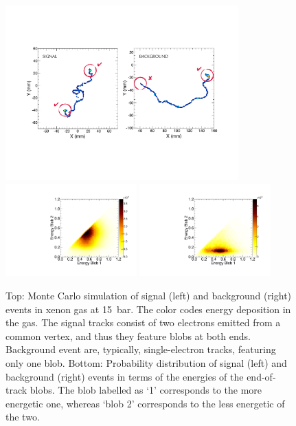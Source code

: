 \documentclass{PoS}
\begin{document}
\begin{figure}
\centering
\includegraphics[width= 0.8\textwidth]{img/TrackSignature.pdf}
\includegraphics[width=0.45\textwidth]{img/EnergyBlobsSignal.pdf}
\includegraphics[width=0.45\textwidth]{img/EnergyBlobsTl208.pdf}
\caption{Top: Monte Carlo simulation of signal (left) and background (right) events in xenon gas at 15~bar. The color codes energy deposition in the gas. The signal tracks consist of two electrons emitted from a common vertex, and thus they feature blobs at both ends. Background event are, typically, single-electron tracks, featuring only one blob. Bottom: Probability distribution of signal (left) and background (right) events in terms of the energies of the end-of-track blobs. The blob labelled as `1' corresponds to the more energetic one, whereas `blob 2' corresponds to the less energetic of the two.} \label{fig.ETRK2}
\end{figure}
\end{document}

